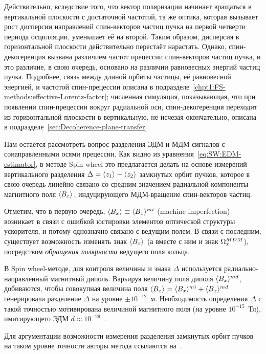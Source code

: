 Действительно, вследствие того, что 
вектор поляризации начинает вращаться в вертикальной плоскости с достаточной частотой, та же оптика,
которая вызывает рост дисперсии направлений спин-векторов частиц пучка на первой четверти
 периода осцилляции, уменьшает её на второй. Таким образом, дисперсия в горизонтальной плоскости
 действительно перестаёт нарастать. Однако, спин-декогеренция вызвана различием частот
 прецессии спин-векторов частиц пучка, и это различие, в свою очередь, основано на различии 
 равновесных энергий частиц пучка. Подробнее, связь между длиной орбиты частицы, её равновесной энергией, и частотой спин-прецессии описана в подразделе~\ref{chpt1:FS-methods:effective-Lorentz-factor};
 численная симуляция, показывающая, что при появлении спин-прецессии вокруг радиальной оси, 
 спин-декогеренция переходит из горизонтальной плоскости в вертикальную, не исчезая окончательно,
 описана в подразделе~\ref{sec:Decoherence-plane-transfer}.
 
Нам остаётся рассмотреть вопрос разделения ЭДМ и МДМ сигналов с сонаправленными осями прецессии.
Как видно из уравнения~\eqref{eq:SW:EDM-estimator}, в методе Spin wheel это предлагается делать 
на основе измерений вертикального разделения $\Delta = \avg{z_1} - \avg{z_2}$ замкнутых орбит пучков,
которое в свою очередь линейно связано со средним значением радиальной компоненты магнитного поля
$\avg{B_x}$, индуцирующего МДМ-вращение спин-векторов частиц. 

Отметим, что в первую очередь, $\avg{B_x} \equiv \avg{B_x}^{mi}$ (machine imperfection) возникает в связи 
с ошибкой юстировки элементов оптической структуры ускорителя, и потому 
однозначно связано с ведущим полем. 
В связи с последним, существует возможность изменять знак $\avg{B_x}$ 
(а вместе с ним и знак $\Omega_x^{MDM}$), посредством \emph{обращения полярности} ведущего поля кольца.

В Spin wheel-методе, для контроля величины и знака $\Delta$ используется радиально-направленный
магнитный диполь. Варьируя величину поля диполя $\avg{B_x}^{md}$, добиваются, чтобы совокупная величина 
поля ${\avg{B_x} = \avg{B_x}^{mi} + \avg{B_x}^{md}}$ генерировала разделение $\Delta$ на уровне 
$\pm 10^{-12}$~м. Необходимость определения $\Delta$ с такой точностью мотивирована
величиной магнитного поля (на уровне $10^{-15}$~Тл), имитирующего ЭДМ ${d\approx 10^{-29}}$~\ecm.

Для аргументации возможности измерения разделения замкнутых орбит пучков на таком уровне точности
авторы метода ссылаются на~\cite{Kawall:BPM}. 


